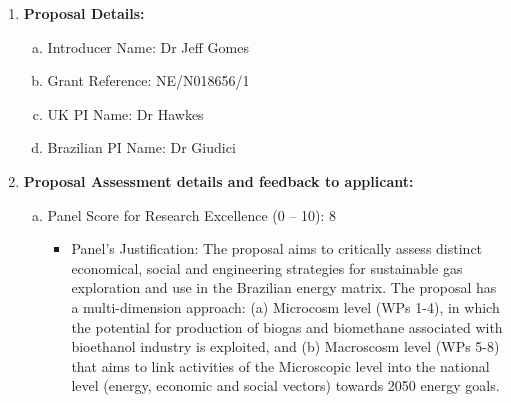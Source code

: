 \documentclass[14pt,twoside]{report}
\begin{document}
  \begin{enumerate}[{\bf 1.}]
%
     \item {\bf Proposal Details:}
        \begin{enumerate}[(a)]
            \item Introducer Name: Dr Jeff Gomes
            \item Grant Reference: NE/N018656/1
            \item UK PI Name: Dr Hawkes
            \item Brazilian PI Name: Dr Giudici
        \end{enumerate}
%
     \item {\bf Proposal Assessment details and feedback to applicant:}
        \begin{enumerate}[(a)]
            \item Panel Score for Research Excellence (0 -- 10): 8
            \begin{itemize}
               \item Panel's Justification: The proposal aims to critically assess distinct economical, social and engineering strategies for sustainable gas exploration and use in the Brazilian energy matrix. The proposal has a multi-dimension approach: (a) Microcosm level (WPs 1-4), in which the potential for production of biogas and biomethane associated with bioethanol industry is exploited, and (b) Macroscosm level (WPs 5-8) that aims to link activities of the Microscopic level into the national level (energy, economic and social vectors) towards 2050 energy goals.


\end{itemize}
\end{enumerate}
\end{enumerate}
\end{document}
